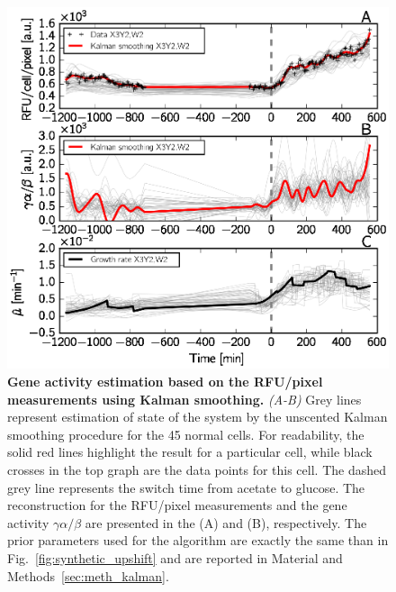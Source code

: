 \begin{figure}[p]
\centering
\includegraphics[scale=1]{./Fig/gene_activity}
\caption{
\textbf{Gene activity estimation based on the RFU/pixel measurements using Kalman smoothing.}
\textit{(A-B)} Grey lines represent estimation of state of the system by the unscented Kalman smoothing procedure for the 45 normal cells.
For readability, the solid red lines highlight the result for a particular cell, while black crosses in the top graph are the data points for this cell.
The dashed grey line represents the switch time from acetate to glucose.
The reconstruction for the RFU/pixel measurements and the gene activity $\gamma \alpha / \beta$ are presented in the (A) and (B), respectively.
The prior parameters used for the algorithm are exactly the same than in Fig.~\ref{fig:synthetic_upshift} and are reported in Material and Methods~\ref{sec:meth_kalman}.
}
\label{fig:gene_activity}
\end{figure}

